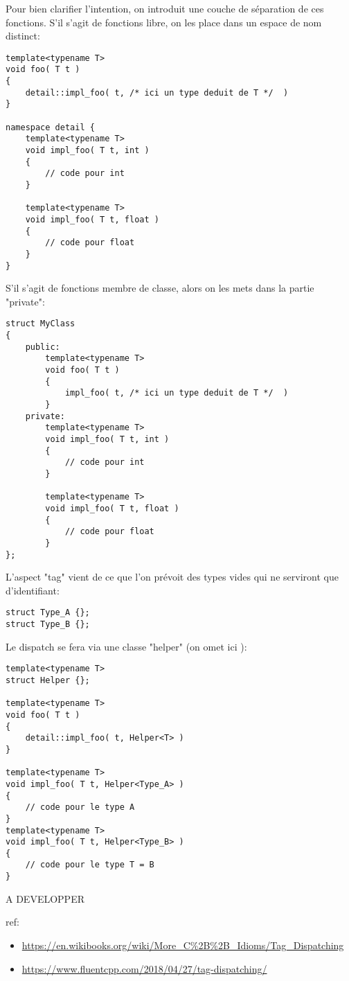 \documentclass[11pt,a4paper]{article}
\begin{document}
Pour bien clarifier l'intention, on introduit une couche de séparation de ces fonctions.
S'il s'agit de fonctions libre, on les place dans un espace de nom distinct:
\begin{lstlisting}
template<typename T>
void foo( T t )
{
	detail::impl_foo( t, /* ici un type deduit de T */  )
}

namespace detail {
	template<typename T>
	void impl_foo( T t, int )
	{
		// code pour int
	}
	
	template<typename T>
	void impl_foo( T t, float )
	{
		// code pour float
	}
}
\end{lstlisting}

S'il s'agit de fonctions membre de classe, alors on les mets dans la partie "private":

\begin{lstlisting}
struct MyClass
{
	public:
		template<typename T>
		void foo( T t )
		{
			impl_foo( t, /* ici un type deduit de T */  )
		}
	private:
		template<typename T>
		void impl_foo( T t, int )
		{
			// code pour int
		}
		
		template<typename T>
		void impl_foo( T t, float )
		{
			// code pour float
		}
};
\end{lstlisting}


L'aspect "tag" vient de ce que l'on prévoit des types vides qui ne serviront que d'identifiant:
\begin{lstlisting}
struct Type_A {};
struct Type_B {};
\end{lstlisting}

Le dispatch se fera via une classe "helper" (on omet ici ):
\begin{lstlisting}
template<typename T>
struct Helper {};

template<typename T>
void foo( T t )
{
	detail::impl_foo( t, Helper<T> )
}

template<typename T>
void impl_foo( T t, Helper<Type_A> )
{
	// code pour le type A
}
template<typename T>
void impl_foo( T t, Helper<Type_B> )
{
	// code pour le type T = B
}
\end{lstlisting}




A DEVELOPPER

ref:
\begin{itemize}
\item \url{https://en.wikibooks.org/wiki/More_C%2B%2B_Idioms/Tag_Dispatching}
\item \url{https://www.fluentcpp.com/2018/04/27/tag-dispatching/}
\end{itemize}
\end{document}
